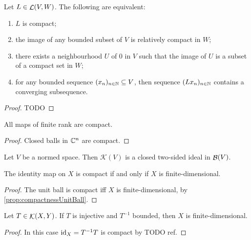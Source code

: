 \begin{proposition}
Let $L\in\mathop{\mathcal{L}}(V,W)$. The following are equivalent:
\begin{enumerate}
\item $L$ is compact;
\item the image of any bounded subset of $V$ is relatively compact in $W$;
\item there exists a neighbourhood $U$ of $0$ in $V$ such that the image of $U$ is a subset of a compact set in $W$;
\item for any bounded sequence $(x_n)_{n\in\mathbb{N}} \subseteq V$, then sequence $(Lx_n)_{n\in\mathbb{N}}$ contains a converging subsequence.
\end{enumerate}
\end{proposition}
\begin{proof}
TODO
\end{proof}
\begin{corollary}
All maps of finite rank are compact.
\end{corollary}
\begin{proof}
Closed balls in $\mathbb{C}^n$ are compact.
\end{proof}

\begin{proposition}
Let $V$ be a normed space. Then $\mathcal{K}(V)$ is a closed two-sided ideal in $\mathop{\mathcal{B}}(V)$.
\end{proposition}

\begin{lemma}
The identity map on $X$ is compact \textup{if and only if} $X$ is finite-dimensional.
\end{lemma}
\begin{proof}
The unit ball is compact iff $X$ is finite-dimensional, by \ref{prop:compactnessUnitBall}.
\end{proof}
\begin{corollary}
Let $T\in\mathop{\mathcal{K}}(X,Y)$. If $T$ is injective and $T^{-1}$ bounded, then $X$ is finite-dimensional.
\end{corollary}
\begin{proof}
In this case $\operatorname{id}_X = T^{-1}T$ is compact by TODO ref.
\end{proof}

